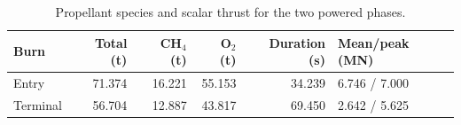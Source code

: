 \begin{table}[htbp]
\centering\small
\caption{Propellant species and scalar thrust for the two powered phases.}
\label{tab:burns}
\begin{tabularx}{\linewidth}{@{}lrrrrX@{}}
\toprule
Burn & Total (t) & CH$_4$ (t) & O$_2$ (t) & Duration (s) & Mean/peak (MN) \\
\midrule
Entry & 71.374 & 16.221 & 55.153 & 34.239 & 6.746 / 7.000 \\
Terminal & 56.704 & 12.887 & 43.817 & 69.450 & 2.642 / 5.625 \\
\bottomrule
\end{tabularx}
\par{}
\end{table}

